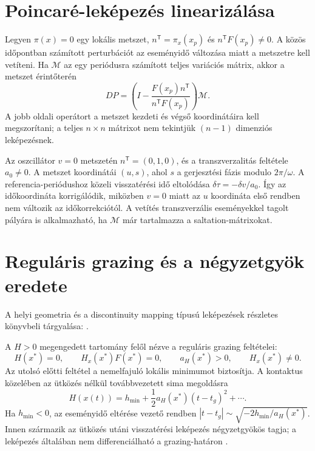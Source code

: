 \section{Poincaré-leképezés linearizálása}
Legyen $\pi(x)=0$ egy lokális metszet, $n^\mathsf T=\pi_x(x_p)$ és $n^\mathsf TF(x_p)\neq0$. A közös időpontban számított perturbációt az eseményidő változása miatt a metszetre kell vetíteni. Ha $\mathcal M$ az egy periódusra számított teljes variációs mátrix, akkor a metszet érintőterén
\begin{equation}\label{eq:poincare_projection}
DP=\left(I-\frac{F(x_p)n^\mathsf T}{n^\mathsf TF(x_p)}\right)\mathcal M.
\end{equation}
A jobb oldali operátort a metszet kezdeti és végső koordinátáira kell megszorítani; a teljes $n\times n$ mátrixot nem tekintjük $(n-1)$ dimenziós leképezésnek.

Az oszcillátor $v=0$ metszetén $n^\mathsf T=(0,1,0)$, és a transzverzalitás feltétele $a_0\neq0$. A metszet koordinátái $(u,s)$, ahol $s$ a gerjesztési fázis modulo $2\pi/\omega$. A referencia-periódushoz közeli visszatérési idő eltolódása $\delta\tau=-\delta v/a_0$. Így az időkoordináta korrigálódik, miközben $v=0$ miatt az $u$ koordináta első rendben nem változik az időkorrekciótól. A vetítés transzverzális eseményekkel tagolt pályára is alkalmazható, ha $\mathcal M$ már tartalmazza a saltation-mátrixokat.

\section{Reguláris grazing és a négyzetgyök eredete}
A helyi geometria és a discontinuity mapping típusú leképezések részletes könyvbeli tárgyalása: \cite[2.5.3. és 6.2--6.3. szakasz]{dib}.

A $H>0$ megengedett tartomány felől nézve a reguláris grazing feltételei:
\[
H(x^*)=0,\qquad H_x(x^*)F(x^*)=0,\qquad a_H(x^*)>0,\qquad H_x(x^*)\neq0.
\]
Az utolsó előtti feltétel a nemelfajuló lokális minimumot biztosítja. A kontaktus közelében az ütközés nélkül továbbvezetett sima megoldásra
\[
H(x(t))=h_{\min}+\frac12a_H(x^*)(t-t_g)^2+\cdots.
\]
Ha $h_{\min}<0$, az eseményidő eltérése vezető rendben $|t-t_g|\sim\sqrt{-2h_{\min}/a_H(x^*)}$. Innen származik az ütközés utáni visszatérési leképezés négyzetgyökös tagja; a leképezés általában nem differenciálható a grazing-határon \cite{nordmark}.

